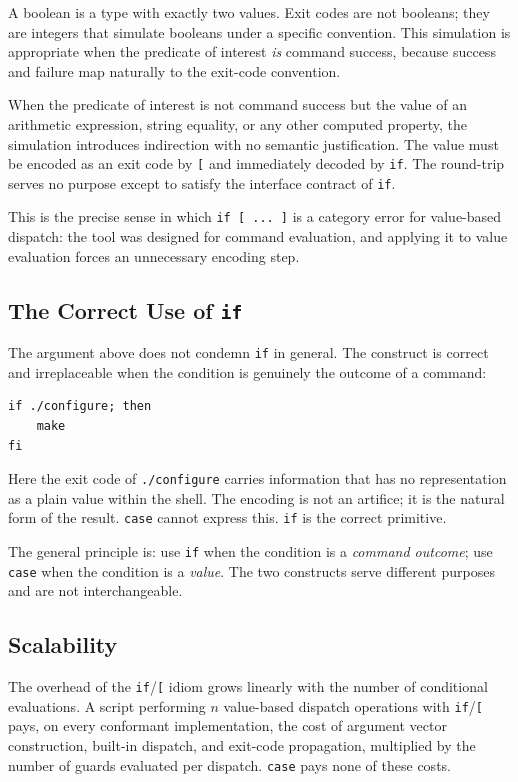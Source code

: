 \documentclass[11pt,a4paper]{article}
\begin{document}
A boolean is a type with exactly two values.
Exit codes are not booleans; they are integers that simulate
booleans under a specific convention.
This simulation is appropriate when the predicate of interest
\emph{is} command success, because success and failure map
naturally to the exit-code convention.

When the predicate of interest is not command success but the
value of an arithmetic expression, string equality, or any other
computed property, the simulation introduces indirection with no
semantic justification.
The value must be encoded as an exit code by \texttt{[} and
immediately decoded by \texttt{if}.
The round-trip serves no purpose except to satisfy the interface
contract of \texttt{if}.

This is the precise sense in which \texttt{if [ ... ]} is a
category error for value-based dispatch: the tool was designed
for command evaluation, and applying it to value evaluation
forces an unnecessary encoding step.

\subsection{The Correct Use of \texttt{if}}

The argument above does not condemn \texttt{if} in general.
The construct is correct and irreplaceable when the condition
is genuinely the outcome of a command:

\begin{lstlisting}[numbers=none,frame=none,aboveskip=2pt,belowskip=2pt]
if ./configure; then
    make
fi
\end{lstlisting}

Here the exit code of \texttt{./configure} carries information
that has no representation as a plain value within the shell.
The encoding is not an artifice; it is the natural form of the
result.
\texttt{case} cannot express this.
\texttt{if} is the correct primitive.

The general principle is: use \texttt{if} when the condition is a
\emph{command outcome}; use \texttt{case} when the condition is a
\emph{value}.
The two constructs serve different purposes and are not
interchangeable.

\subsection{Scalability}

The overhead of the \texttt{if}/\texttt{[} idiom grows linearly
with the number of conditional evaluations.
A script performing $n$ value-based dispatch operations with
\texttt{if}/\texttt{[} pays, on every conformant implementation,
the cost of argument vector construction, built-in dispatch, and
exit-code propagation, multiplied by the number of guards evaluated
per dispatch.
\texttt{case} pays none of these costs.
\end{document}
